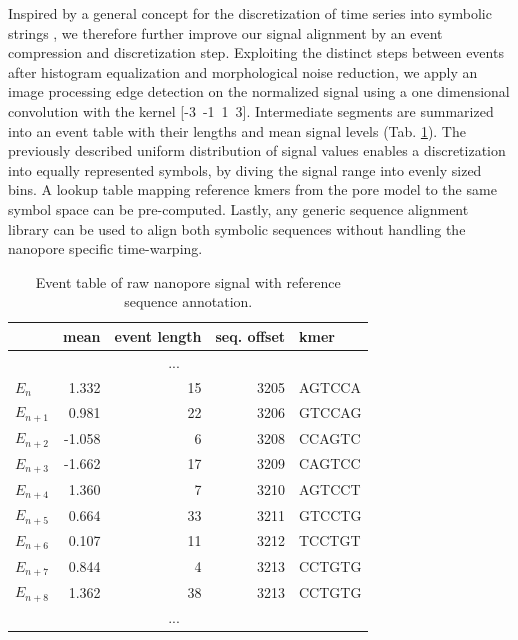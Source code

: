 Inspired by a general concept for the discretization of time series into symbolic strings \cite{Lin2003}, we therefore further improve our signal alignment by an event compression and discretization step. Exploiting the distinct steps between events after histogram equalization and morphological noise reduction, we apply an image processing edge detection on the normalized signal using a one dimensional convolution with the kernel [-3\ -1\ 1\ 3]. Intermediate segments are summarized into an event table with their lengths and mean signal levels (Tab. \ref{tab:signal:events}). The previously described uniform distribution of signal values enables a discretization into equally represented symbols, by diving the signal range into evenly sized bins. A lookup table mapping reference kmers from the pore model to the same symbol space can be pre-computed. Lastly, any generic sequence alignment library can be used to align both symbolic sequences without handling the nanopore specific time-warping.


\begin{table}[ht]
	\centering
	\caption[Event detection and annotation]{Event table of raw nanopore signal with reference sequence annotation.}
	\label{tab:signal:events}
	\begin{tabular}{l|r|r|r|l}
		& mean & event length & seq. offset & kmer \\
		\hline 
		& \multicolumn{3}{c|}{...} &  \\
		\hline
		$ E_{n} $ &  1.332  & 15 & 3205 & AGTCCA \\
		\rowcolor{LightOrange}
		$ E_{n+1} $ &  0.981  & 22 & 3206 & GTCCAG \\
		$ E_{n+2} $ & -1.058  &  6 & 3208 & CCAGTC \\
		$ E_{n+3} $ & -1.662  & 17 & 3209 & CAGTCC \\
		$ E_{n+4} $ &  1.360  &  7 & 3210 & AGTCCT \\
		$ E_{n+5} $ &  0.664  & 33 & 3211 & GTCCTG \\
		$ E_{n+6} $ &  0.107  & 11 & 3212 & TCCTGT \\
		\rowcolor{LightGreen}
		$ E_{n+7} $ &  0.844  &  4 & 3213 & CCTGTG \\
		\rowcolor{LightGreen}
		$ E_{n+8} $ &  1.362  & 38 & 3213 & CCTGTG \\
		\hline
		& \multicolumn{3}{c|}{...} &  \\
	\end{tabular} 
\end{table}


